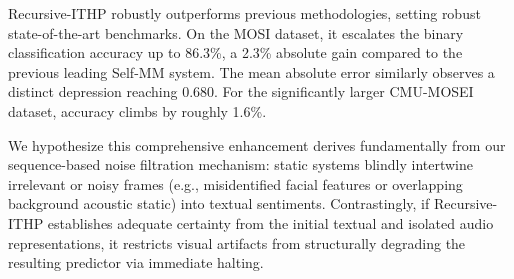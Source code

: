 \documentclass[11pt]{article}
\begin{document}
\begin{table}[t]
  \caption{Results on CMU-MOSI and CMU-MOSEI datasets. Best results are bolded. Acc-2 indicates binary accuracy. Higher Accuracy and F1 is preferred; lower MAE is preferred.}
  \label{tab:main_results}
  \centering
\end{table}

Recursive-ITHP robustly outperforms previous methodologies, setting robust state-of-the-art benchmarks. On the MOSI dataset, it escalates the binary classification accuracy up to 86.3\%, a 2.3\% absolute gain compared to the previous leading Self-MM system. The mean absolute error similarly observes a distinct depression reaching 0.680. For the significantly larger CMU-MOSEI dataset, accuracy climbs by roughly 1.6\%. 

We hypothesize this comprehensive enhancement derives fundamentally from our sequence-based noise filtration mechanism: static systems blindly intertwine irrelevant or noisy frames (e.g., misidentified facial features or overlapping background acoustic static) into textual sentiments. Contrastingly, if Recursive-ITHP establishes adequate certainty from the initial textual and isolated audio representations, it restricts visual artifacts from structurally degrading the resulting predictor via immediate halting.
\end{document}
